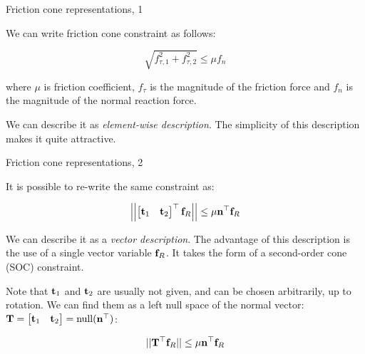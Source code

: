 \documentclass{beamer}
\begin{document}
\begin{frame}{Friction cone representations, 1}
	\begin{flushleft}
		
		We can write friction cone constraint as follows:
		
		\begin{equation}
			\sqrt{f_{\tau, 1}^2 + f_{\tau, 2}^2} \leq \mu f_n
		\end{equation}
		
		where $\mu$ is friction coefficient, $f_\tau$ is the magnitude of the friction force and $f_n$ is the magnitude of the normal reaction force.
		
		\bigskip
		
		We can describe it as \emph{element-wise description}. The simplicity of this description makes it quite attractive.
		
		
	\end{flushleft}
\end{frame}


\begin{frame}{Friction cone representations, 2}
	\begin{flushleft}
		
		It is possible to re-write the same constraint as:
		
		\begin{equation}
			\left|\left| \begin{bmatrix}
				\mathbf{t}_1 & \mathbf{t}_2
			\end{bmatrix}^\top
		\mathbf{f}_R \right|\right| 
		\leq \mu \mathbf{n}^\top \mathbf{f}_R
		\end{equation}
		
		We can describe it as a \emph{vector description}. The advantage of this description is the use of a single vector variable $\mathbf{f}_R$. It takes the form of a second-order cone (SOC) constraint.
		
		\bigskip
		
		Note that $\mathbf{t}_1$ and $\mathbf{t}_2$ are usually not given, and can be chosen arbitrarily, up to rotation. We can find them as a left null space of the normal vector: $\mathbf{T} = \begin{bmatrix}
			\mathbf{t}_1 & \mathbf{t}_2
		\end{bmatrix} = \text{null}(\mathbf{n}^\top)$: 
		
		\begin{equation}
			|| \mathbf{T}^\top\mathbf{f}_R ||
			\leq \mu \mathbf{n}^\top \mathbf{f}_R
		\end{equation}
	
	\end{flushleft}
\end{frame}
\end{document}
